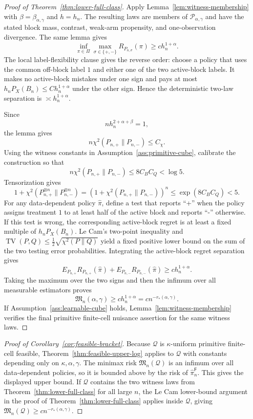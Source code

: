 \documentclass[11pt]{article}
\theoremstyle{definition}
\theoremstyle{plain}
\theoremstyle{remark}
\begin{document}
\begin{proof}[Proof of Theorem~\ref{thm:lower-full-class}]
Apply Lemma~\ref{lem:witness-membership} with
\(\beta=\beta_{\alpha,\gamma}\) and \(h=h_n\).  The resulting laws are
members of \(\mathcal P_{\alpha,\gamma}\) and have the stated block mass,
contrast, weak-arm propensity, and one-observation divergence.  The same
lemma gives
\[
\inf_{\pi\in\Pi}\max_{\sigma\in\{+,-\}}R_{P_{n,\sigma}}(\pi)
\ge c h_n^{1+\alpha}.
\]
The local label-flexibility clause gives the reverse order: choose a policy
that uses the common off-block label \(1\) and either one of the two
active-block labels.  It makes no active-block mistakes under one sign and
pays at most \(h_nP_X(B_n)\le C h_n^{1+\alpha}\) under the other sign.  Hence
the deterministic two-law separation is \(\asymp h_n^{1+\alpha}\).

Since
\[
n h_n^{2+\alpha+\beta}=1,
\]
the lemma gives
\[
n\chi^2(P_{n,+}\|P_{n,-})\le C_\chi.
\]
Using the witness constants in Assumption~\ref{ass:primitive-cube}, calibrate
the construction so that
\[
n\chi^2(P_{n,+}\|P_{n,-})\le 8C_BC_Q<\log 5.
\]
Tensorization gives
\[
1+\chi^2(P_{n,+}^{\otimes n}\|P_{n,-}^{\otimes n})
=(1+\chi^2(P_{n,+}\|P_{n,-}))^n
\le \exp(8C_BC_Q)<5.
\]
For any data-dependent policy \(\widehat\pi\), define a test that reports
``+'' when the policy assigns treatment \(1\) to at least half of the active
block and reports ``-'' otherwise.  If this test is wrong, the corresponding
active-block regret is at least a fixed multiple of \(h_nP_X(B_n)\).  Le
Cam's two-point inequality and
\(\operatorname{TV}(P,Q)\le\tfrac12\sqrt{\chi^2(P\|Q)}\) yield a fixed
positive lower bound on the sum of the two testing error probabilities.
Integrating the active-block regret separation gives
\[
E_{P_{n,+}}R_{P_{n,+}}(\widehat\pi)
+E_{P_{n,-}}R_{P_{n,-}}(\widehat\pi)
\ge c h_n^{1+\alpha}.
\]
Taking the maximum over the two signs and then the infimum over all
measurable estimators proves
\[
\mathfrak M_n(\alpha,\gamma)\ge c h_n^{1+\alpha}
=c n^{-r_*(\alpha,\gamma)}.
\]
If Assumption~\ref{ass:learnable-cube} holds,
Lemma~\ref{lem:witness-membership} verifies the final primitive finite-cell
nuisance assertion for the same witness laws.
\end{proof}

\begin{proof}[Proof of Corollary~\ref{cor:feasible-bracket}]
Because \(\mathcal Q\) is \(\kappa\)-uniform primitive finite-cell feasible,
Theorem~\ref{thm:feasible-upper-log} applies to \(\mathcal Q\) with constants
depending only on \(\kappa,\alpha,\gamma\).  The minimax risk
\(\mathfrak M_n(\mathcal Q)\) is an infimum over all data-dependent policies,
so it is bounded above by the risk of \(\widehat\pi_n^{\mathsf F}\).  This
gives the displayed upper bound.  If \(\mathcal Q\) contains the two witness
laws from Theorem~\ref{thm:lower-full-class} for all large \(n\), the Le Cam
lower-bound argument in the proof of Theorem~\ref{thm:lower-full-class}
applies inside \(\mathcal Q\), giving
\(\mathfrak M_n(\mathcal Q)\ge c n^{-r_*(\alpha,\gamma)}\).
\end{proof}
\end{document}
